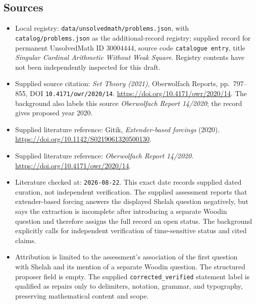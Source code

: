\documentclass[11pt]{article}
\begin{document}
\subsection{Sources}
\begin{itemize}
\item Local registry: \texttt{data/unsolvedmath/problems.json}, with \texttt{catalog/problems.json} as the additional-record registry; supplied record for permanent UnsolvedMath ID \(30004444\), source code \texttt{catalogue entry}, title \emph{Singular Cardinal Arithmetic Without Weak Square}. Registry contents have not been independently inspected for this draft.
\item Supplied source citation: \emph{Set Theory (2021)}, Oberwolfach Reports, pp.~797--855, DOI \texttt{10.4171/owr/2020/14}. \url{https://doi.org/10.4171/owr/2020/14}. The background also labels this source \emph{Oberwolfach Report 14/2020}; the record gives proposed year 2020.
\item Supplied literature reference: Gitik, \emph{Extender-based forcings} (2020). \url{https://doi.org/10.1142/S0219061320500130}.
\item Supplied literature reference: \emph{Oberwolfach Report 14/2020}. \url{https://doi.org/10.4171/owr/2020/14}.
\item Literature checked at: \texttt{2026-08-22}. This exact date records supplied dated curation, not independent verification. The supplied assessment reports that extender-based forcing answers the displayed Shelah question negatively, but says the extraction is incomplete after introducing a separate Woodin question and therefore assigns the full record an open status. The background explicitly calls for independent verification of time-sensitive status and cited claims.
\item Attribution is limited to the assessment's association of the first question with Shelah and its mention of a separate Woodin question. The structured proposer field is empty. The supplied \texttt{corrected\_verified} statement label is qualified as repairs only to delimiters, notation, grammar, and typography, preserving mathematical content and scope.
\end{itemize}
\end{document}
